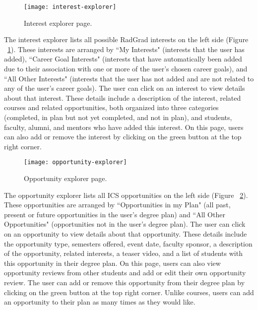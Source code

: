 \begin{figure}[htbp!]
\centering
\texttt{[image: interest-explorer]}
\caption{Interest explorer page.}
\label{interest-explorer}
\end{figure}

The interest explorer lists all possible RadGrad interests on the left side (Figure ~\ref{interest-explorer}). These interests are arranged by ``My Interests" (interests that the user has added), ``Career Goal Interests" (interests that have automatically been added due to their association with one or more of the user's chosen career goals), and ``All Other Interests" (interests that the user has not added and are not related to any of the user's career goals). The user can click on an interest to view details about that interest. These details include a description of the interest, related courses and related opportunities, both organized into three categories (completed, in plan but not yet completed, and not in plan), and students, faculty, alumni, and mentors who have added this interest. On this page, users can also add or remove the interest by clicking on the green button at the top right corner.

\begin{figure}[htbp!]
\centering
\texttt{[image: opportunity-explorer]}
\caption{Opportunity explorer page.}
\label{opportunity-explorer}
\end{figure}

The opportunity explorer lists all ICS opportunities on the left side (Figure ~\ref{opportunity-explorer}). These opportunities are arranged by ``Opportunities in my Plan" (all past, present or future opportunities in the user's degree plan) and ``All Other Opportunities" (opportunities not in the user's degree plan). The user can click on an opportunity to view details about that opportunity. These details include the opportunity type, semesters offered, event date, faculty sponsor, a description of the opportunity, related interests, a teaser video, and a list of students with this opportunity in their degree plan. On this page, users can also view opportunity reviews from other students and add or edit their own opportunity review. The user can add or remove this opportunity from their degree plan by clicking on the green button at the top right corner. Unlike courses, users can add an opportunity to their plan as many times as they would like.

